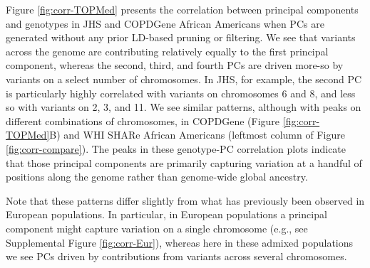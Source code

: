 \documentclass[12pt]{article}
\begin{document}
Figure \ref{fig:corr-TOPMed} presents the correlation between principal components and genotypes in JHS and COPDGene African Americans when PCs are generated without any prior LD-based pruning or filtering.
We see that variants across the genome are contributing relatively equally to the first principal component, whereas the second, third, and fourth PCs are driven more-so by variants on a select number of chromosomes.
In JHS, for example, the second PC is particularly highly correlated with variants on chromosomes 6 and 8, and less so with variants on 2, 3, and 11.
We see similar patterns, although with peaks on different combinations of chromosomes, in COPDGene (Figure \ref{fig:corr-TOPMed}B) and WHI SHARe African Americans (leftmost column of Figure \ref{fig:corr-compare}).
The peaks in these genotype-PC correlation plots indicate that those principal components are primarily capturing variation at a handful of positions along the genome rather than genome-wide global ancestry.

Note that these patterns differ slightly from what has previously been observed in European populations.
In particular, in European populations a principal component might capture variation on a single chromosome (e.g., see Supplemental Figure \ref{fig:corr-Eur}), whereas here in these admixed populations we see PCs driven by contributions from variants across several chromosomes.
\end{document}
